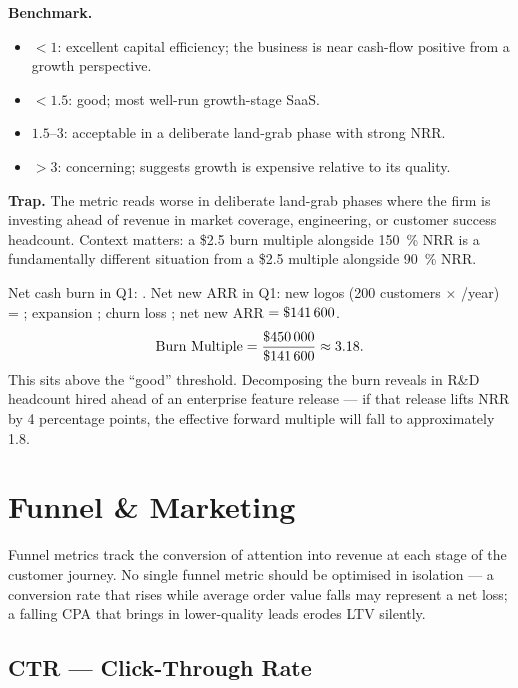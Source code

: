 \textbf{Benchmark.}
\begin{itemize}
  \item $< 1$: excellent capital efficiency; the business is near cash-flow positive from
    a growth perspective.
  \item $< 1.5$: good; most well-run growth-stage SaaS.
  \item $1.5$--$3$: acceptable in a deliberate land-grab phase with strong NRR.
  \item $> 3$: concerning; suggests growth is expensive relative to its quality.
\end{itemize}

\textbf{Trap.} The metric reads worse in deliberate land-grab phases where the firm is
investing ahead of revenue in market coverage, engineering, or customer success headcount.
Context matters: a \$2.5 burn multiple alongside \qty{150}{\percent} NRR is a fundamentally
different situation from a \$2.5 multiple alongside \qty{90}{\percent} NRR.

\begin{example}
Net cash burn in Q1: . Net new ARR in Q1: new logos (\num{200} customers
$\times$ /year) = ; expansion ; churn loss ;
net new ARR $= \$\num{141600}$.
\[
  \text{Burn Multiple} = \frac{\$\num{450000}}{\$\num{141600}} \approx 3.18.
\]
This sits above the ``good'' threshold. Decomposing the burn reveals  in R\&D
headcount hired ahead of an enterprise feature release --- if that release lifts NRR by
4 percentage points, the effective forward multiple will fall to approximately 1.8.
\end{example}


\section{Funnel \& Marketing}

Funnel metrics track the conversion of attention into revenue at each stage of the customer
journey. No single funnel metric should be optimised in isolation --- a conversion rate that
rises while average order value falls may represent a net loss; a falling CPA that brings in
lower-quality leads erodes LTV silently.

\subsection{CTR --- Click-Through Rate}

